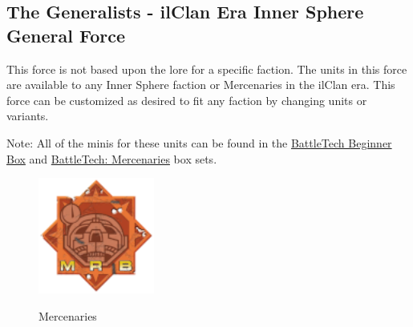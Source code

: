 \subsection{The Generalists - ilClan Era Inner Sphere General Force}

This force is not based upon the lore for a specific faction.
The units in this force are available to any Inner Sphere faction or Mercenaries in the ilClan era.
This force can be customized as desired to fit any faction by changing units or variants.

Note: All of the minis for these units can be found in the \href{https://www.sarna.net/wiki/BattleTech_Beginner_Box}{BattleTech Beginner Box} and \href{https://www.sarna.net/wiki/BattleTech:_Mercenaries}{BattleTech: Mercenaries} box sets.

\begin{figure}[!h]
  \centering
  \includegraphics[alt='Mercenary Logo', width=1.5in, height=1.5in]{img/Mercenary.png}
  \caption*{Mercenaries}
\end{figure}

